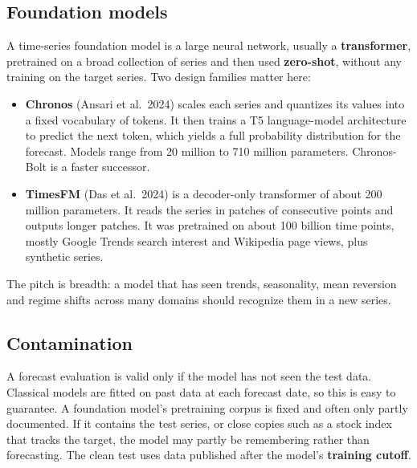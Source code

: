 \subsection{Foundation models}
\label{sec:21-fm}

A time-series foundation model is a large neural network, usually a \textbf{transformer}, pretrained on a broad collection of series and then used \textbf{zero-shot}, without any training on the target series. Two design families matter here:

\begin{itemize}
  \item \textbf{Chronos} (Ansari et al.\ 2024) scales each series and quantizes its values into a fixed vocabulary of tokens. It then trains a T5 language-model architecture to predict the next token, which yields a full probability distribution for the forecast. Models range from 20 million to 710 million parameters. Chronos-Bolt is a faster successor.
  \item \textbf{TimesFM} (Das et al.\ 2024) is a decoder-only transformer of about 200 million parameters. It reads the series in patches of consecutive points and outputs longer patches. It was pretrained on about 100 billion time points, mostly Google Trends search interest and Wikipedia page views, plus synthetic series.
\end{itemize}

The pitch is breadth: a model that has seen trends, seasonality, mean reversion and regime shifts across many domains should recognize them in a new series.

\subsection{Contamination}
\label{sec:21-contam}

A forecast evaluation is valid only if the model has not seen the test data. Classical models are fitted on past data at each forecast date, so this is easy to guarantee. A foundation model's pretraining corpus is fixed and often only partly documented. If it contains the test series, or close copies such as a stock index that tracks the target, the model may partly be remembering rather than forecasting. The clean test uses data published after the model's \textbf{training cutoff}.

